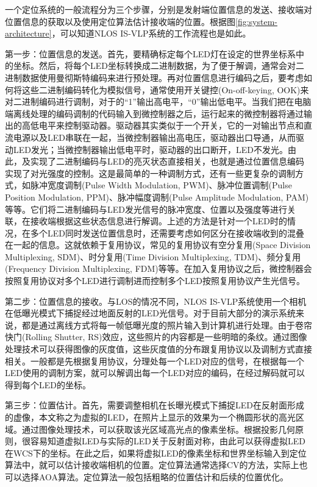 一个定位系统的一般流程分为三个步骤，分别是发射端位置信息的发送、接收端对位置信息的获取以及使用定位算法估计接收端的位置。根据图\ref{fig:system-architecture}，可以知道NLOS IS-VLP系统的工作流程也是如此。

第一步：位置信息的发送。首先，要精确标定每个LED灯在设定的世界坐标系中的坐标。然后，将每个LED坐标转换成二进制数据，为了便于解调，通常会对二进制数据使用曼彻斯特编码来进行预处理。再对位置信息进行编码之后，要考虑如何将这些二进制编码转化为模拟信号，通常使用开关键控(On-off-keying, OOK)来对二进制编码进行调制，对于的“1”输出高电平，“0”输出低电平。当我们把在电脑端离线处理的编码调制的代码输入到微控制器之后，运行起来的微控制器将通过输出的高低电平来控制驱动器。驱动器其实类似于一个开关，它的一对输出节点和直流电源以及LED串联在一起，当微控制器输出高电压，驱动器出口导通，从而驱动LED发光；当微控制器输出低电平时，驱动器的出口断开，LED不发光。由此，及实现了二进制编码与LED的亮灭状态直接相关，也就是通过位置信息编码实现了对光强度的控制。这是最简单的一种调制方式，还有一些更复杂的调制方式，如脉冲宽度调制(Pulse Width Modulation, PWM)、脉冲位置调制(Pulse Position Modulation, PPM)、脉冲幅度调制(Pulse Amplitude Modulation, PAM)等等。它们将二进制编码与LED发光信号的脉冲宽度、位置以及强度等进行关联，在接收端根据这些状态信息进行解调。上述的方法是针对一个LED时的情况，在多个LED同时发送位置信息时，还需要考虑如何区分在接收端收到的混叠在一起的信息。这就依赖于复用协议，常见的复用协议有空分复用(Space Division Multiplexing, SDM)、时分复用(Time Division Multiplexing, TDM)、频分复用(Frequency Division Multiplexing, FDM)等等。在加入复用协议之后，微控制器会按照复用协议对多个LED进行调制进而控制多个LED按照复用协议产生光信号。


第二步：位置信息的接收。与LOS的情况不同，NLOS IS-VLP系统使用一个相机在低曝光模式下捕捉经过地面反射的LED光信号。对于目前大部分的演示系统来说，都是通过离线方式将每一帧低曝光度的照片输入到计算机进行处理。由于卷帘快门(Rolling Shutter, RS)效应，这些照片的内容都是一些明暗的条纹。通过图像处理技术可以获得图像的灰度值，这些灰度值的分布跟复用协议以及调制方式直接相关。一般都是先根据复用协议，分理处每一个LED对应的信号，在根据每一个LED使用的调制方案，就可以解调出每一个LED对应的编码，在经过解码就可以得到每个LED的坐标。

第三步：位置估计。首先，需要调整相机在长曝光模式下捕捉LED在反射面形成的虚像，本文称之为虚拟的LED，在照片上显示的效果为一个椭圆形状的高光区域。通过图像处理技术，可以获取该光区域高光点的像素坐标。根据投影几何原则，很容易知道虚拟LED与实际的LED关于反射面对称，由此可以获得虚拟LED在WCS下的坐标。在此之后，如果将虚拟LED的像素坐标和世界坐标输入到定位算法中，就可以估计接收端相机的位置。定位算法通常选择CV的方法，实际上也可以选择AOA算法。定位算法一般包括粗略的位置估计和后续的位置优化。

